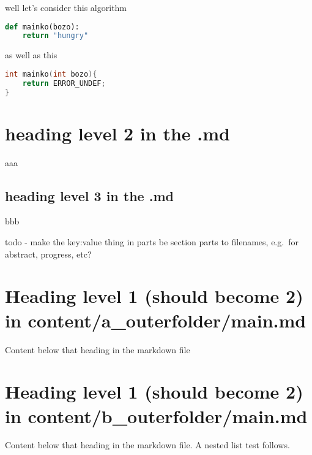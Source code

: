 \documentclass{paper}
\begin{document}
well let's consider this algorithm

\begin{lstlisting}[language=Python]
def mainko(bozo):
    return "hungry"
\end{lstlisting}

as well as this

\begin{lstlisting}[language=C]
int mainko(int bozo){
    return ERROR_UNDEF;
}
\end{lstlisting}

\hypertarget{heading-level-2-in-the-.md}{%
\section{heading level 2 in the .md}\label{heading-level-2-in-the-.md}}

aaa

\hypertarget{heading-level-3-in-the-.md}{%
\subsection{heading level 3 in the
.md}\label{heading-level-3-in-the-.md}}

bbb

todo - make the key:value thing in parts be section parts to filenames,
e.g.~for abstract, progress, etc?

\hypertarget{heading-level-1-should-become-2-in-contenta_outerfoldermain.md}{%
\section{Heading level 1 (should become 2) in
content/a\_outerfolder/main.md}\label{heading-level-1-should-become-2-in-contenta_outerfoldermain.md}}

Content below that heading in the markdown file

\hypertarget{heading-level-1-should-become-2-in-contentb_outerfoldermain.md}{%
\section{Heading level 1 (should become 2) in
content/b\_outerfolder/main.md}\label{heading-level-1-should-become-2-in-contentb_outerfoldermain.md}}

Content below that heading in the markdown file. A nested list test
follows.
\end{document}
